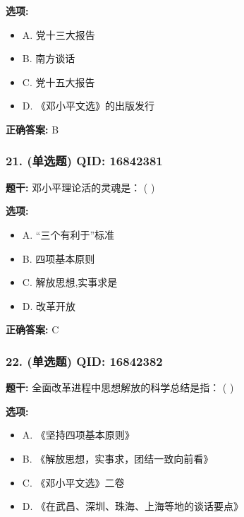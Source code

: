 \documentclass[12pt,UTF8]{ctexart}
\begin{document}
\textbf{选项:}
\begin{itemize}[leftmargin=*]

  \item A. 党十三大报告

  \item B. 南方谈话

  \item C. 党十五大报告

  \item D. 《邓小平文选》的出版发行

\end{itemize}

\textbf{正确答案:}
B

\vspace{0.3em}\hrulefill\vspace{0.7em}

\subsubsection*{21. (单选题) \small QID: 16842381}

\textbf{题干:}
邓小平理论活的灵魂是： ( )

\textbf{选项:}
\begin{itemize}[leftmargin=*]

  \item A. “三个有利于”标准

  \item B. 四项基本原则

  \item C. 解放思想,实事求是

  \item D. 改革开放

\end{itemize}

\textbf{正确答案:}
C

\vspace{0.3em}\hrulefill\vspace{0.7em}

\subsubsection*{22. (单选题) \small QID: 16842382}

\textbf{题干:}
全面改革进程中思想解放的科学总结是指： ( )

\textbf{选项:}
\begin{itemize}[leftmargin=*]

  \item A. 《坚持四项基本原则》

  \item B. 《解放思想，实事求，团结一致向前看》

  \item C. 《邓小平文选》二卷

  \item D. 《在武昌、深圳、珠海、上海等地的谈话要点》

\end{itemize}
\end{document}
